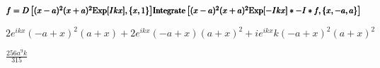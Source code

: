 \documentclass{article}
\begin{document}
\begin{doublespace}
\noindent\(\pmb{\text{}}\)
\end{doublespace}

\begin{doublespace}
\noindent\(\pmb{\text{}}\\
\pmb{f = D\left[(x-a)^2 (x+a)^2 \text{Exp}[I k x],\{x,1\}\right]}\\
\pmb{\text{Integrate}\left[(x-a)^2 (x+a)^2 \text{Exp}[-I k x]*-I *f,\{x,-a,a\}\right]}\)
\end{doublespace}

\begin{doublespace}
\noindent\(2 e^{i k x} (-a+x)^2 (a+x)+2 e^{i k x} (-a+x) (a+x)^2+i e^{i k x} k (-a+x)^2 (a+x)^2\)
\end{doublespace}

\begin{doublespace}
\noindent\(\frac{256 a^9 k}{315}\)
\end{doublespace}

\begin{doublespace}
\noindent\(\pmb{\text{}}\)
\end{doublespace}

\begin{doublespace}
\noindent\(\pmb{\text{}}\)
\end{doublespace}
\end{document}
